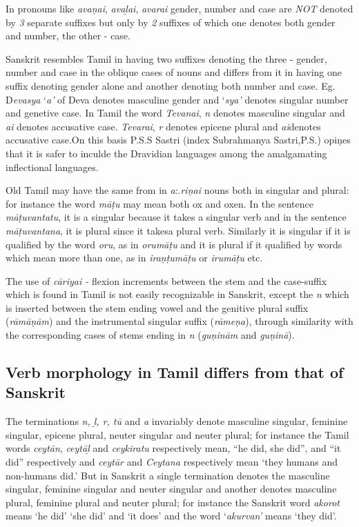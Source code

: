 In pronouns like \textit{avaṇai}, \textit{avaḻai}, \textit{avarai} gender, number and case are \textit{NOT} denoted by \textit{3} separate suffixes but only by\textit{ 2} suffixes of which one denotes both gender and number, the other - case.

Sanskrit resembles Tamil in having two suffixes denoting the three - gender, number and case in the oblique cases of nouns and differs from it in having one suffix denoting gender alone and another denoting both number and case. Eg. D\textit{evasya} ‘\textit{a’} of Deva denotes masculine gender and ‘\textit{sya’} denotes singular number and genetive case. In Tamil the word \textit{Tevanai},\textit{ n} denotes masculine singular and \textit{ai} denotes accusative case. \textit{Tevarai}, \textit{r} denotes epicene plural and \textit{ai}denotes accusative case.On this basis P.S.S Sastri (index Subrahmanya Sastri,P.S.) opiṇes that it is safer to inculde the Dravidian languages among the amalgamating inflectional languages.

Old Tamil may have the same from in \textit{a}:.\textit{riṇai} nouns both in singular and plural: for instance the word \textit{māṭu} may mean both ox and oxen. In the sentence \textit{māṭuvantatu}, it is a singular because it takes a singular verb and in the sentence \textit{māṭuvantana}, it is plural since it takesa plural verb. Similarly it is singular if it is qualified by the word \textit{oru}, as in \textit{orumāṭu} and it is plural if it qualified by words which mean more than one, as in \textit{iraṇṭumāṭu} or \textit{irumāṭu} etc.

The use of \textit{cāriyai -} flexion increments between the stem and the case-suffix which is found in Tamil is not easily recognizable in Sanskrit, except the \textit{n} which is inserted between the stem ending vowel and the genitive plural suffix (\textit{rāmāṇām}) and the instrumental singular suffix (\textit{rāmeṇa}), through similarity with the corresponding cases of stems ending in \textit{n} (\textit{guṇinām} and \textit{guṇinā}).

\subsection*{Verb morphology in Tamil differs from that of Sanskrit}

The terminations \textit{n, ḻ, r, tū} and \textit{a} invariably denote masculine singular, feminine singular, epicene plural, neuter singular and neuter plural; for instance the Tamil words \textit{ceytān}, \textit{ceytāḻ} and \textit{ceykiratu} respectively mean, “he did, she did”, and “it did” respectively and \textit{ceytār} and \textit{Ceytana} respectively mean ‘they humans and non-humans did.’ But in Sanskrit a single termination denotes the masculine singular, feminine singular and neuter singular and another denotes masculine plural, feminine plural and neuter plural; for instance the Sanskrit word \textit{akorot} means ‘he did’ ‘she did’ and ‘it does’ and the word ‘\textit{akurvan’} means ‘they did’.

